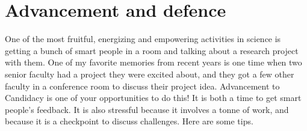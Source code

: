 \documentclass[letterpaper,10pt,english]{sphinxmanual}
\begin{document}
\section{Advancement and defence}
\label{\detokenize{04WhatIsAPhD:advancement-and-defence}}
\sphinxAtStartPar
One of the most fruitful, energizing and empowering activities in science is getting a bunch of smart people in a room and talking about a research project with them.
One of my favorite memories from recent years is one time when two senior faculty had a project they were excited about, and they got a few other faculty in a conference room to discuss their project idea.
Advancement to Candidacy is one of your opportunities to do this! It is both a time to get smart people’s feedback. It is also stressful because it involves a tonne of work, and because it is a checkpoint to discuss challenges. Here are some tips.
\end{document}
